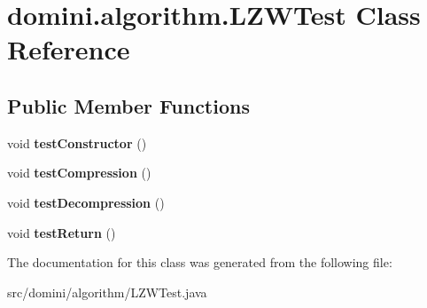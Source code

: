 \hypertarget{classdomini_1_1algorithm_1_1LZWTest}{}\section{domini.\+algorithm.\+L\+Z\+W\+Test Class Reference}
\label{classdomini_1_1algorithm_1_1LZWTest}
\subsection*{Public Member Functions}
\begin{DoxyCompactItemize}
\item 
\mbox{\label{classdomini_1_1algorithm_1_1LZWTest_a7c9c06d11571cf8ebcaff5404c920e30}} 
void {\bfseries test\+Constructor} ()
\item 
\mbox{\label{classdomini_1_1algorithm_1_1LZWTest_a83d521e2900616a43a01e02fc54e6e02}} 
void {\bfseries test\+Compression} ()
\item 
\mbox{\label{classdomini_1_1algorithm_1_1LZWTest_abec7c3f2f555e72270904c5fba516fc9}} 
void {\bfseries test\+Decompression} ()
\item 
\mbox{\label{classdomini_1_1algorithm_1_1LZWTest_a9c12c40702a978985f84dc7feece791e}} 
void {\bfseries test\+Return} ()
\end{DoxyCompactItemize}


The documentation for this class was generated from the following file\+:\begin{DoxyCompactItemize}
\item 
src/domini/algorithm/L\+Z\+W\+Test.\+java\end{DoxyCompactItemize}
